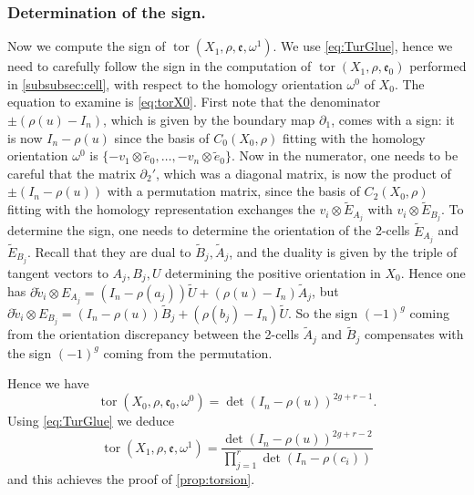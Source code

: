 \documentclass[JEP,XML,SOM,Unicode,NoFloatCountersInSection,published]{cedram}
\theoremstyle{plain}
\theoremstyle{definition}
\theoremstyle{remark}
\numberwithin{equation}{section}
\DeclareMathOperator{\tor}{tor}
\begin{document}
\subsubsection*{Determination of the sign.}
Now we compute the sign of $\tor(X_1, \rho, \mathfrak e, \omega^1)$. We use \cref{eq:TurGlue}, hence we need to carefully follow the sign in the computation of $\tor(X_1, \rho, \mathfrak e_0)$ performed in \cref{subsubsec:cell}, with respect to the homology orientation $\omega^0$ of $X_0$. The equation to examine is \cref{eq:torX0}.
First note that the denominator $\pm (\rho(u) - I_n)$, which is given by the boundary map $\partial_1$, comes with a sign: it is now $I_n - \rho(u)$ since the basis of $C_0(X_0, \rho)$ fitting with the homology orientation $\omega^0$ is
$\{ -v_1 \otimes \widetilde e_0, \ldots, - v_n \otimes \widetilde e_0 \}$. Now in the numerator, one needs to be careful that the matrix $\partial_2'$, which was a diagonal matrix, is now the product of $\pm(I_n - \rho(u))$ with a permutation matrix, since the basis of $C_2(X_0, \rho)$ fitting with the homology representation exchanges the $v_i \otimes \widetilde E_{A_j}$ with $v_i \otimes \widetilde E_{B_j}$.
To determine the sign, one needs to determine the orientation of the 2-cells $\widetilde E_{A_j}$ and $\widetilde E_{B_j}$. Recall that they are dual to $\widetilde B_j, \widetilde A_j$, and the duality is given by the triple of tangent vectors to $A_j, B_j, U$ determining the positive orientation in $X_0$. Hence one has $\partial \widetilde v_i \otimes E_{A_j} = (I_n - \rho(a_j)) \widetilde U + (\rho(u) - I_n) \widetilde A_j$, but
$\partial \widetilde v_i \otimes E_{B_j} = (I_n - \rho(u)) \widetilde B_j + (\rho(b_j) - I_n) \widetilde U$.
So the sign $(-1)^g$ coming from the orientation discrepancy between the 2-cells $\widetilde A_j$ and $\widetilde B_j$ compensates with the sign $(-1)^g$ coming from the permutation.

Hence we have
\[
\tor(X_0, \rho, \mathfrak e_0, \omega^0) =\det(I_n - \rho(u))^{2g+r-1}.
\]
Using \cref{eq:TurGlue} we deduce
\begin{equation}
\label{eq:signTor}
\tor(X_1, \rho, \mathfrak e, \omega^1) = \frac{\det(I_n - \rho(u))^{2g+r-2}}{\prod_{j=1}^r \det(I_n-\rho(c_i))}
\end{equation}
and this achieves the proof of \cref{prop:torsion}.
\end{document}
